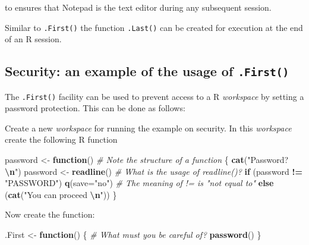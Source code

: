 \documentclass[
]{book}
\newenvironment{Shaded}{\begin{snugshade}}{\end{snugshade}}
\newcommand{\AttributeTok}[1]{\textcolor[rgb]{0.13,0.29,0.53}{#1}}
\newcommand{\CommentTok}[1]{\textcolor[rgb]{0.56,0.35,0.01}{\textit{#1}}}
\newcommand{\ControlFlowTok}[1]{\textcolor[rgb]{0.13,0.29,0.53}{\textbf{#1}}}
\newcommand{\FunctionTok}[1]{\textcolor[rgb]{0.13,0.29,0.53}{\textbf{#1}}}
\newcommand{\NormalTok}[1]{#1}
\newcommand{\OtherTok}[1]{\textcolor[rgb]{0.56,0.35,0.01}{#1}}
\newcommand{\SpecialCharTok}[1]{\textcolor[rgb]{0.81,0.36,0.00}{\textbf{#1}}}
\newcommand{\StringTok}[1]{\textcolor[rgb]{0.31,0.60,0.02}{#1}}
\begin{document}
to ensures that Notepad is the text editor during any subsequent session.

Similar to \texttt{.First()} the function \texttt{.Last()} can be created for execution at the end of an R session.

\subsection{\texorpdfstring{Security: an example of the usage of \texttt{.First()}}{Security: an example of the usage of .First()}}\label{security-an-example-of-the-usage-of-.first}

The \texttt{.First()} facility can be used to prevent access to a R \emph{{workspace}} by setting a password protection. This can be done as follows:

Create a new \emph{{workspace}} for running the example on security. In this \emph{{workspace}} create the following R function

\begin{Shaded}
\begin{Highlighting}[]
\NormalTok{password }\OtherTok{\textless{}{-}} \ControlFlowTok{function}\NormalTok{()        }\CommentTok{\# Note the structure of a function}
\NormalTok{\{ }\FunctionTok{cat}\NormalTok{(}\StringTok{"Password? }\SpecialCharTok{\textbackslash{}n}\StringTok{"}\NormalTok{)}
\NormalTok{  password }\OtherTok{\textless{}{-}} \FunctionTok{readline}\NormalTok{()      }\CommentTok{\# What is the usage of readline()? }
  \ControlFlowTok{if}\NormalTok{ (password }\SpecialCharTok{!=} \StringTok{"PASSWORD"}\NormalTok{) }
    \FunctionTok{q}\NormalTok{(}\AttributeTok{save=}\StringTok{"no"}\NormalTok{)              }\CommentTok{\# The meaning of !=  is "not equal to"}
  \ControlFlowTok{else}\NormalTok{ (}\FunctionTok{cat}\NormalTok{(}\StringTok{"You can proceed }\SpecialCharTok{\textbackslash{}n}\StringTok{"}\NormalTok{))}
\NormalTok{\}               }
\end{Highlighting}
\end{Shaded}

Now create the function:

\begin{Shaded}
\begin{Highlighting}[]
\NormalTok{.First }\OtherTok{\textless{}{-}} \ControlFlowTok{function}\NormalTok{()}
\NormalTok{\{   }\CommentTok{\#  What must you be careful of?}
   \FunctionTok{password}\NormalTok{()}
\NormalTok{\}}
\end{Highlighting}
\end{Shaded}
\end{document}
